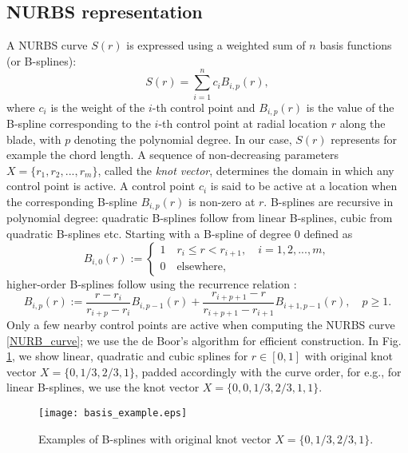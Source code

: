 \subsection{NURBS representation}
A NURBS curve $S(r)$ is expressed using a weighted sum of $n$ basis functions (or B-splines):
\begin{equation}\label{NURB_curve}
S(r) = \sum_{i=1}^{n} c_i B_{i,p}(r),
\end{equation}
where $c_i$ is the weight of the $i$-th control point and $B_{i,p}(r)$ is the value of the B-spline corresponding to the $i$-th control point at radial location $r$ along the blade, with $p$ denoting the polynomial degree.  In our case, $S(r)$ represents for example the chord length. A sequence of non-decreasing parameters $X = \{r_1,r_2,...,r_m\}$, called the \textit{knot vector}, determines the domain in which any control point is active. A control point $c_i$ is said to be active at a location when the corresponding B-spline $B_{i,p}(r)$ is non-zero at $r$. B-splines are recursive in polynomial degree: quadratic B-splines follow from linear B-splines, cubic from quadratic B-splines etc. Starting with a B-spline of degree 0 defined as 
\begin{equation}\label{linearBspline}
B_{i,0}(r) :=
\begin{cases}
1\quad r_i\leq r < r_{i+1},\quad i = 1,2,...,m,\\
0\quad\text{elsewhere,}
\end{cases} 
\end{equation}
higher-order B-splines follow using the recurrence relation \cite{deBoor}:
\begin{equation}\label{NURBS_recurrence}
B_{i,p}(r) := \frac{r - r_i}{r_{i+p} - r_i}B_{i,p-1}(r) + \frac{r_{i+p+1} - r}{r_{i+p+1} - r_{i+1}}B_{i+1,p-1}(r),\quad p\geq1.
\end{equation}
Only a few nearby control points are active when computing the NURBS curve \eqref{NURB_curve}; we use the de Boor's algorithm \cite{deBoor} for efficient construction. 
In Fig. \ref{basis_examples}, we show linear, quadratic and cubic splines for $r\in[0,1]$ with original knot vector $X = \{0,1/3,2/3,1\}$, padded accordingly with the curve order, for e.g., for linear B-splines, we use the knot vector $X = \{0,0,1/3,2/3,1,1\}$.
\begin{figure}[h!]
\centering
\texttt{[image: basis\_example.eps]}
\caption{Examples of B-splines with original knot vector $X = \{0,1/3,2/3,1\}$.}
\label{basis_examples}
\end{figure}

